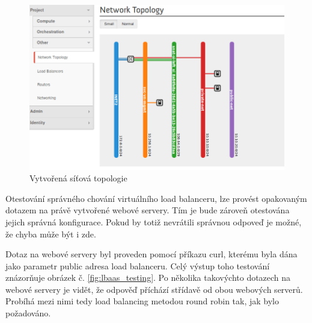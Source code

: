 \begin{figure}[h]
\begin{centering}
\includegraphics[scale=0.45]{images/lbaas_topologie}
\par\end{centering}
\caption{Vytvořená síťová topologie\label{fig:lbaas_topologie}}
\end{figure}

Otestování správného chování virtuálního load balanceru, lze provést opakovaným dotazem na právě vytvořené webové servery. Tím je bude zároveň otestována jejich správná konfigurace. Pokud by totiž nevrátili správnou odpoveď je možné, že chyba může být i zde. 

Dotaz na webové servery byl proveden pomocí příkazu curl, kterému byla dána jako parametr public adresa load balanceru. Celý výstup toho testování znázorňuje obrázek č. \ref{fig:lbaas_testing}. Po několika takovýchto dotazech na webové servery je vidět, že odpověď příchází střídavě od obou webových serverů. Probíhá mezi nimi tedy load balancing metodou round robin tak, jak bylo požadováno.

